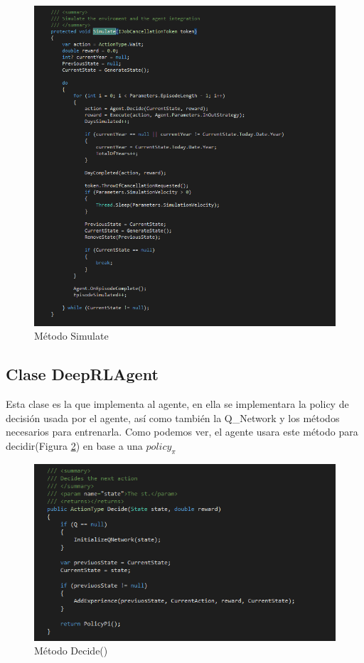\begin{figure}[h!]
	\centering
	\includegraphics[scale=0.7]{imagenes/screen5.png}
	\caption{Método Simulate}
	\label{fig:cap4:4}
\end{figure}

\clearpage
\subsection{Clase DeepRLAgent}

Esta clase es la que implementa al agente, en ella se implementara la policy de decisión usada por el agente, así como también la Q\_Network y los métodos necesarios para entrenarla.
Como podemos ver, el agente usara este método para decidir(Figura \ref{fig:cap4:5}) en base a una $policy_\pi$
\begin{figure}[h!]
	\centering
	\includegraphics[scale=0.6]{imagenes/screen6.png}
	\caption{Método Decide()}
	\label{fig:cap4:5}
\end{figure}

